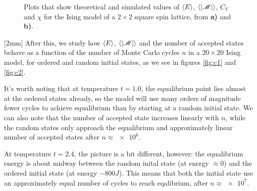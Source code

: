 \documentclass[12pt,a4paper]{article}
\newcommand\M[1]{\begin{bmatrix} #1 \end{bmatrix}} %
\def\M{\mathscr{M}}
\newcommand\oppg[1]{\reversemarginnote{\textcolor{black!40}{#1)}}[2mm]}
\begin{document}
\begin{figure}[!ht]

  \caption{Plots that show theoretical and simulated values of $\expval{E}$, $\expval{|\M|}$, $C_V$ and $\chi$ for the Ising model of a $2 \times 2$ square spin lattice, from \textbf{a)} and \textbf{b)}.} \label{fig:b}
\end{figure}

\oppg{c}
After this, we study how $\expval{E}$, $\expval{|\M|}$ and the number of accepted states behave as a function of the number of Monte Carlo cycles $n$ in a $20 \times 20$ Ising model, for ordered and random initial states, as we see in figures \ref{fig:c1} and \ref{fig:c2}.

It's worth noting that at temperature $t = 1.0$, the equalibrium point lies almost at the ordered states already, so the model will use many orders of magnitude fewer cycles to achieve equalibrium than by starting at a random initial state. We can also note that the number of accepted state increases linearly with $n$, while the random states only approach the equalibrium and approximately linear number of accepted states after $n \approx \num{e6}$.

At temperature $t = 2.4$, the picture is a bit different, however: the equalibrium energy is about midway between the random inital state (at energy $\approx 0$) and the ordered initial state (at energy $-800J$). This means that both the initial state use an approximately equal number of cycles to reach eqalibrium, after $n \approx \num{e7}$.
\end{document}
